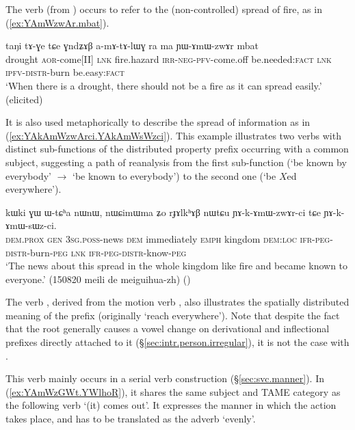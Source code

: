 The verb  (from ) occurs to refer to the (non-controlled) spread of fire, as in (\ref{ex:YAmWzwAr.mbat}).  

 \begin{exe}
\ex \label{ex:YAmWzwAr.mbat}
 \gll taŋi tɤ-ɣe tɕe ɣndʑɤβ a-mɤ-tɤ-lɯɣ ra ma ɲɯ-ɤmɯ-zwɤr mbat \\
 drought \textsc{aor}-come[II] \textsc{lnk} fire.hazard \textsc{irr}-\textsc{neg}-\textsc{pfv}-come.off be.needed:\textsc{fact} \textsc{lnk} \textsc{ipfv}-\textsc{distr}-burn be.easy:\textsc{fact} \\
 \glt  `When there is a drought, there should not be a fire as it can spread easily.' (elicited)
  \end{exe}


It is also used metaphorically to describe the spread of information as in (\ref{ex:YAkAmWzwArci.YAkAmWsWzci}). This example illustrates two verbs with distinct sub-functions of the distributed property  prefix occurring with a common subject, suggesting a path of reanalysis from the first sub-function (`be known by everybody'  $\rightarrow$ `be known to everybody') to the second one (`be $X$ed everywhere').

 \begin{exe}
\ex \label{ex:YAkAmWzwArci.YAkAmWsWzci}
 \gll kɯki ɣɯ ɯ-tɕʰa nɯnɯ, nɯɕimɯma ʑo rɟɤlkʰɤβ nɯtɕu ɲɤ-k-ɤmɯ-zwɤr-ci tɕe ɲɤ-k-ɤmɯ-sɯz-ci. \\
 \textsc{dem}.\textsc{prox} \textsc{gen} \textsc{3sg}.\textsc{poss}-news \textsc{dem} immediately \textsc{emph} kingdom \textsc{dem}:\textsc{loc} \textsc{ifr}-\textsc{peg}-\textsc{distr}-burn-\textsc{peg} \textsc{lnk} \textsc{ifr}-\textsc{peg}-\textsc{distr}-know-\textsc{peg} \\
 \glt `The news about this spread in the whole kingdom like fire and became known to everyone.' (150820 meili de meiguihua-zh) ()
\end{exe}

The verb , derived from the motion verb , also illustrates the spatially distributed meaning  of the prefix  (originally `reach everywhere'). Note that despite the fact that the root  generally causes a  \fl{}  vowel change on derivational and inflectional prefixes directly attached to it (§\ref{sec:intr.person.irregular}), it is not the case with .

This verb  mainly occurs in a serial verb construction (§\ref{sec:svc.manner}). In  (\ref{ex:YAmWzGWt.YWlhoR}), it shares the same subject and TAME category as the following verb  `(it) comes out'. It expresses the manner in which the action takes place, and has to be translated as the adverb `evenly'.

